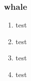 \begin{frame}
  \frametitle{whale}
	 \begin{enumerate}
	    \item test
	    \item test
	    \item test
	    \item test
	  \end{enumerate}
\end{frame}